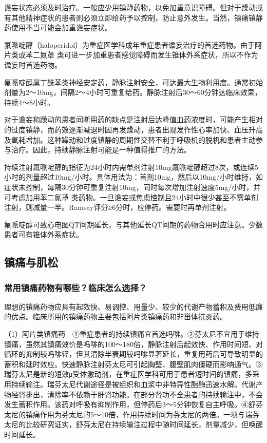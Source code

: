 谵妄状态必须及时治疗。一般应少用镇静药物，以免加重意识障碍。但对于躁动或有其他精神症状的患者则必须立即给药予以控制，防止意外发生。当然，镇痛镇静药使用不当可能会加重谵妄症状。

氟哌啶醇（haloperidol）为重症医学科成年重症患者谵妄治疗的首选药物。由于阿片类或苯二氮䓬
类可进一步加重患者感觉障碍而发生锥体外系症状，所以不作为谵妄时首选药物。

氟哌啶醇属丁酰苯类神经安定药，静脉注射安全，可达最大生物利用度。通常初始剂量为2～10mg，间隔2～4小时可重复给药。静脉注射后30～60分钟达临床效果，持续4～8小时。

对于谵妄和躁动的患者间断用药的缺点是注射后达峰值血药浓度时，可能产生相对的过度镇静，而药效逐渐减退时因再发躁动，患者出现发作性心率加快、血压升高及氧耗增加。这种躁动和过度镇静的周期性交替不利于呼吸机的脱机和患者主动参与治疗。因此，持续静脉注射可能是一种值得推广的方法。

持续注射氟哌啶醇的指征为24小时内需单剂注射10mg氟哌啶醇超过8次，或连续5小时的剂量超过10mg/小时。具体用法为：首剂10mg，然后以10mg/小时维持，如症状未控制，每隔30分钟可重复注射10mg，同时每次增加注射速度5mg/小时，并可考虑加用苯二氮䓬
类药物。一旦谵妄或焦虑控制且24小时中很少甚至不需单剂注射，则减量一半。Ramsay评分≥6分时，应停药。需要时再单剂注射。

氟哌啶醇可致心电图QT间期延长，与其他延长QT间期的药物合用时应注意。少数患者可有锥体外系症状。

\subsection{镇痛与肌松}

\subsubsection{常用镇痛药物有哪些？临床怎么选择？}

理想的镇痛药物应具有起效快、易调控、用量少、较少的代谢产物蓄积及费用低廉的优点。临床所用的镇痛药物主要包括阿片类镇痛药和非甾体抗炎药。

（1）阿片类镇痛药　①重症患者的持续镇痛宜首选吗啡。②芬太尼不宜用于维持镇痛，虽然其镇痛效价是吗啡的100～180倍，静脉注射后起效快、作用时间短、对循环的抑制较吗啡轻，但其清除半衰期较吗啡显著延长，重复用药后可导致明显的蓄积和延时效应。快速静脉注射芬太尼可引起胸壁、腹壁肌肉僵硬而影响通气。③瑞芬太尼是新的短效μ受体激动剂，在重症医学科可用于患者短时间的镇痛，多采用持续输注。瑞芬太尼代谢途径是被组织和血浆中非特异性酯酶迅速水解。代谢产物经肾排出，清除率不依赖于肝肾功能。在部分肾功不全患者的持续输注中，不会发生蓄积作用。该药对呼吸有抑制作用，但停药后3～5分钟恢复自主呼吸。④舒芬太尼的镇痛作用为芬太尼的5～10倍，作用持续时间为芬太尼的两倍。一项与瑞芬太尼的比较研究证实，舒芬太尼在持续输注过程中随时间延长，剂量减少，但唤醒时间延长。

